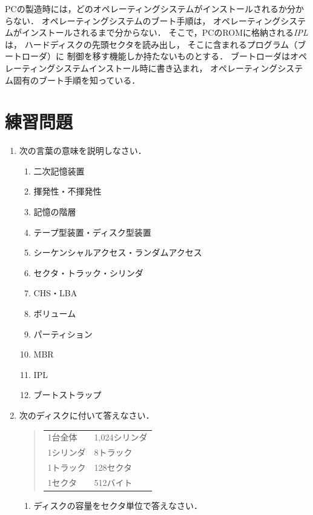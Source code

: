 PCの製造時には，どのオペレーティングシステムがインストールされるか分からない．
オペレーティングシステムのブート手順は，
オペレーティングシステムがインストールされるまで分からない．
そこで，PCのROMに格納される\emph{IPL}は，
ハードディスクの先頭セクタを読み出し，
そこに含まれるプログラム（ブートローダ）に
制御を移す機能しか持たないものとする．
ブートローダはオペレーティングシステムインストール時に書き込まれ，
オペレーティングシステム固有のブート手順を知っている．

\section*{練習問題}
\begin{enumerate}
  \renewcommand{\labelenumi}{\ttfamily\arabic{chapter}.\arabic{enumi}}
  \setlength{\leftskip}{1em}
\item 次の言葉の意味を説明しなさい．
  \begin{enumerate}
  \item 二次記憶装置
  \item 揮発性・不揮発性
  \item 記憶の階層
  \item テープ型装置・ディスク型装置
  \item シーケンシャルアクセス・ランダムアクセス
  \item セクタ・トラック・シリンダ
  \item CHS・LBA
  \item ボリューム
  \item パーティション
  \item MBR
  \item IPL
  \item ブートストラップ
  \end{enumerate}
\item 次のディスクに付いて答えなさい．
  \begin{quote}
    \begin{tabular}{l l}
      1台全体   & 1,024シリンダ  \\
      1シリンダ & 8トラック      \\
      1トラック & 128セクタ      \\
      1セクタ   & 512バイト
    \end{tabular}
  \end{quote}
  \begin{enumerate}
  \item ディスクの容量をセクタ単位で答えなさい．

\end{enumerate}
\end{enumerate}
